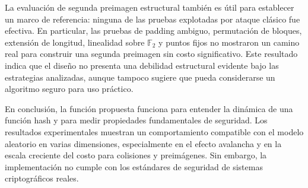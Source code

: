 \documentclass[11pt, letterpaper]{article}
\begin{document}
La evaluación de segunda preimagen estructural también es útil para establecer un marco de referencia: ninguna de las pruebas explotadas por ataque clásico fue efectiva. En particular, las pruebas de padding ambiguo, permutación de bloques, extensión de longitud, linealidad sobre $\mathbb{F}_2$ y puntos fijos no mostraron un camino real para construir una segunda preimagen sin costo significativo. Este resultado indica que el diseño no presenta una debilidad estructural evidente bajo las estrategias analizadas, aunque tampoco sugiere que pueda considerarse un algoritmo seguro para uso práctico.

En conclusión, la función propuesta funciona para entender la dinámica de una función hash y para medir propiedades fundamentales de seguridad. Los resultados experimentales muestran un comportamiento compatible con el modelo aleatorio en varias dimensiones, especialmente en el efecto avalancha y en la escala creciente del costo para colisiones y preimágenes. Sin embargo, la implementación no cumple con los estándares de seguridad de sistemas criptográficos reales.
\end{document}
